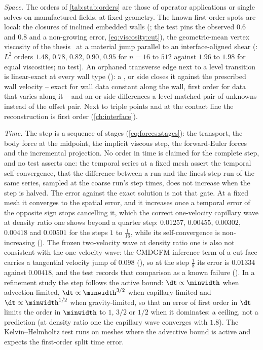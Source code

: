 \emph{Space.} The orders of \cref{tab:stab:orders} are those of operator
applications or single solves on manufactured fields, at fixed geometry.
The known first-order spots are local: the closures of inclined embedded
walls (; the test pins the observed $0.6$ and $0.8$ and a
non-growing error, \cref{eq:viscosity:cut}), the
geometric-mean vertex viscosity of the thesis~ at a
material jump parallel to an interface-aligned shear (: $L^2$
orders $1.48$, $0.78$, $0.82$, $0.90$, $0.95$ for $n=16$ to $512$ against
$1.96$ to $1.98$ for equal viscosities; no test). An orphaned transverse
edge next to a level transition is linear-exact at every wall type
(): a ,  or  side
closes it against the prescribed wall velocity -- exact for wall data constant
along the wall, first order for data that varies along it -- and an
 or  side differences a
level-matched pair of unknowns instead of the offset pair. Next to triple points and at the
contact line the reconstruction is first order (\cref{ch:interface}).

\emph{Time.} The step is a sequence of stages (\cref{eq:forces:stages}):
the transport, the body force at the midpoint, the implicit viscous step,
the forward-Euler forces and the incremental projection. No order in time is
claimed for the complete step, and no test asserts one: the temporal series
at a fixed mesh assert the temporal self-convergence, that the difference
between a run and the finest-step run of the same series, sampled at the
coarse run's step times, does not increase when the step is halved. The
error against the exact solution is not that gate. At a fixed mesh it
converges to the spatial error, and it increases once a temporal error of the
opposite sign stops cancelling it, which the correct one-velocity capillary
wave at density ratio one shows beyond a quarter step: $0.01257$, $0.00455$,
$0.00302$, $0.00418$ and $0.00501$ for the steps $1$ to $\tfrac1{16}$, while
its self-convergence is non-increasing (). The frozen
two-velocity wave at density ratio one is also not consistent with the
one-velocity wave: the CMDGFM inference term of a cut face carries a
tangential velocity jump of $0.098$ (), so at the step $\tfrac18$
its error is $0.01334$ against $0.00418$, and the test records that
comparison as a known failure ().
In a refinement study the step follows the active bound: $\dt\propto\minwidth$
when advection-limited, $\dt\propto\minwidth^{3/2}$ when capillary-limited and
$\dt\propto\minwidth^{1/2}$ when gravity-limited, so that an error of first
order in $\dt$ limits the order in $\minwidth$ to $1$, $3/2$ or $1/2$ when it
dominates: a ceiling, not a prediction (at density ratio one the capillary
wave converges with $1.8$). The Kelvin--Helmholtz test runs on meshes where the advective
bound is active and expects the first-order split time error.

